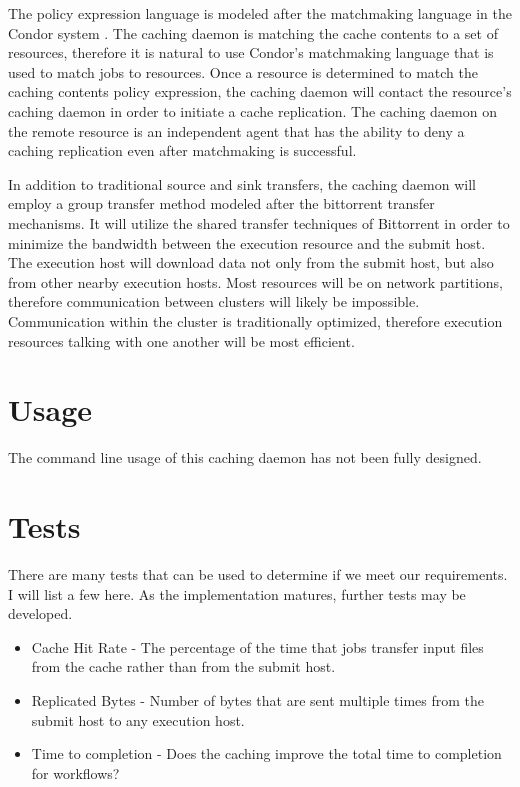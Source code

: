 The policy expression language is modeled after the matchmaking language in the Condor system \cite{raman1998matchmaking}.  The caching daemon is matching the cache contents to a set of resources, therefore it is natural to use Condor's matchmaking language that is used to match jobs to resources.  Once a resource is determined to match the caching contents policy expression, the caching daemon will contact the resource's caching daemon in order to initiate a cache replication.  The caching daemon on the remote resource is an independent agent that has the ability to deny a caching replication even after matchmaking is successful.  

In addition to traditional source and sink transfers, the caching daemon will employ a group transfer method modeled after the bittorrent \cite{cohen2008bittorrent} transfer mechanisms.  It will utilize the shared transfer techniques of Bittorrent in order to minimize the bandwidth between the execution resource and the submit host.  The execution host will download data not only from the submit host, but also from other nearby execution hosts.  Most resources will be on network partitions, therefore communication between clusters will likely be impossible.  Communication within the cluster is traditionally optimized, therefore execution resources talking with one another will be most efficient.

\section{Usage}
The command line usage of this caching daemon has not been fully designed.

\section{Tests}

There are many tests that can be used to determine if we meet our requirements.  I will list a few here.  As the implementation matures, further tests may be developed.

\begin{itemize}
\item Cache Hit Rate - The percentage of the time that jobs transfer input files from the cache rather than from the submit host.
\item Replicated Bytes - Number of bytes that are sent multiple times from the submit host to any execution host.
\item Time to completion - Does the caching improve the total time to completion for workflows?

\end{itemize}

